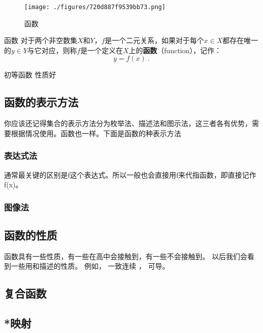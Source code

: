 \begin{figure}[ht]
\centering
\texttt{[image: ./figures/720d887f9539bb73.png]}
\caption{函数} \label{fig_functi_1}
\end{figure}
\begin{definition}{函数}
对于两个非空数集$X$和$Y$，$f$是一个二元关系，如果对于每个$x\in X$都存在唯一的$y\in Y$与它对应，则称$f$是一个定义在$X$上的\textbf{函数}（function），记作：
\begin{equation}
y=f(x)~.
\end{equation}

\end{definition}



初等函数
性质好


\subsection{函数的表示方法}

你应该还记得集合的表示方法分为枚举法、描述法和图示法，这三者各有优势，需要根据情况使用。函数也一样。下面是函数的种表示方法

\subsubsection{表达式法}

通常最关键的区别是f这个表达式。所以一般也会直接用f来代指函数，即直接记作f(x)。

\subsubsection{图像法}

\subsection{函数的性质}

函数具有一些性质，有一些在高中会接触到，有一些不会接触到。
以后我们会看到一些用和描述的性质。 例如， 一致连续 %
， 可导。

\subsection{复合函数}

\subsection{*映射}

